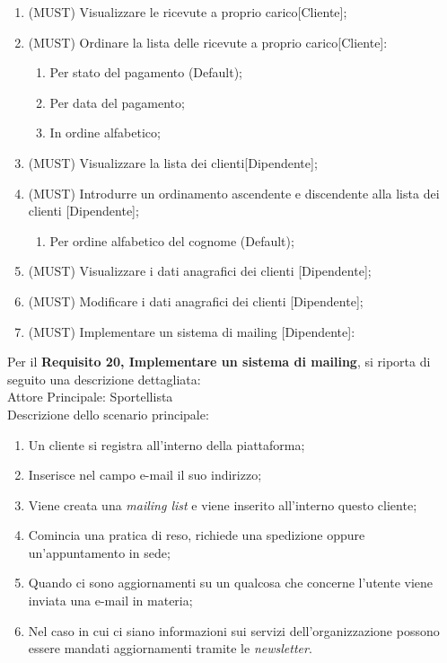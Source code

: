 \begin{enumerate}
\begin{enumerate}
    \end{enumerate} 
  \item{(MUST)} Visualizzare le ricevute a proprio carico[Cliente];
  \item {(MUST)} Ordinare la lista delle ricevute a proprio carico[Cliente]:
    \begin{enumerate}
      \item Per stato del pagamento (Default);
      \item Per data del pagamento;
      \item In ordine alfabetico;
    \end{enumerate}
  \item{(MUST)} Visualizzare la lista dei clienti[Dipendente];
  \item{(MUST)} Introdurre un ordinamento ascendente e discendente alla lista dei clienti [Dipendente];
  \begin{enumerate}
  	\item Per ordine alfabetico del cognome (Default);
  \end{enumerate}
  \item{(MUST)} Visualizzare i dati anagrafici dei clienti [Dipendente];
  \item{(MUST)} Modificare i dati anagrafici dei clienti [Dipendente];
  \item {(MUST)}  Implementare un sistema di mailing [Dipendente]:
\end{enumerate}
Per il \textbf{Requisito 20, Implementare un sistema di mailing}, si riporta di seguito una descrizione dettagliata: \\
Attore Principale: Sportellista \\
Descrizione dello scenario principale:  
\begin{enumerate}
  \item Un cliente si registra all'interno della piattaforma;
  \item Inserisce nel campo e-mail il suo indirizzo;
  \item Viene creata una \textit{mailing list} e viene inserito all'interno questo cliente;
  \item Comincia una pratica di reso, richiede una spedizione oppure un'appuntamento in sede;
  \item Quando ci sono aggiornamenti su un qualcosa che concerne l'utente viene inviata una e-mail in materia;
  \item Nel caso in cui ci siano informazioni sui servizi dell'organizzazione possono essere mandati aggiornamenti tramite le \textit{newsletter}.
\end{enumerate}

